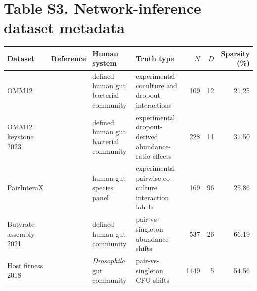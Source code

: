 \section*{Table S3. Network-inference dataset metadata}
\scriptsize
\setlength{\tabcolsep}{2.5pt}
\begin{center}
\begin{tabular}{>{\raggedright\arraybackslash}p{}>{\raggedright\arraybackslash}p{}>{\raggedright\arraybackslash}p{}>{\raggedright\arraybackslash}p{}rrr}
\toprule
Dataset & Reference & Human system & Truth type & $N$ & $D$ & Sparsity (\%) \\
\midrule
OMM12 & \citealt{Weiss2022OMM12} & defined human gut bacterial community & experimental coculture and dropout interactions & 109 & 12 & 21.25 \\
OMM12 keystone 2023 & \citealt{Weiss2023Keystone} & defined human gut bacterial community & experimental dropout-derived abundance-ratio effects & 228 & 11 & 31.50 \\
PairInteraX & \citealt{Zhu2025PairInteraX} & human gut species panel & experimental pairwise co-culture interaction labels & 169 & 96 & 25.86 \\
Butyrate assembly 2021 & \citealt{Clark2021Butyrate} & defined human gut community & pair-vs-singleton abundance shifts & 537 & 26 & 66.19 \\
Host fitness 2018 & \citealt{Gould2018HostFitness} & \textit{Drosophila} gut community & pair-vs-singleton CFU shifts & 1449 & 5 & 54.56 \\
\bottomrule
\end{tabular}
\end{center}
\setlength{\tabcolsep}{6pt}
\normalsize

